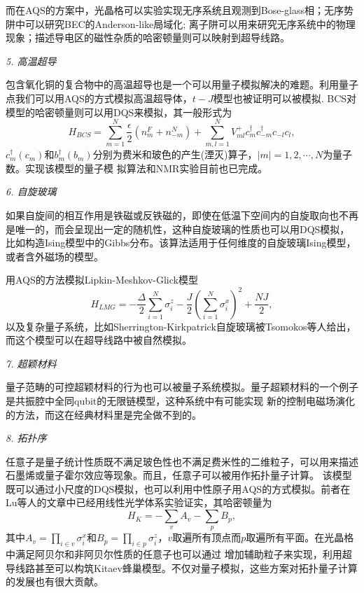 而在AQS的方案中，光晶格可以实验实现无序系统且观测到Bose-glass相\cite{atomsim7}；无序势阱中可以研究BEC的Anderson-like局域化\cite{atomsim6};
离子阱可以用来研究无序系统中的物理现象\cite{dis1}；描述导电区的磁性杂质的哈密顿量则可以映射到超导线路\cite{supersim3}。

\emph{5. 高温超导}

包含氧化铜的复合物中的高温超导也是一个可以用量子模拟解决的难题。利用量子点我们可以用AQS的方式模拟高温超导体\cite{dotsim3}，$t-J$模型也被证明可以被模拟\cite{high1}.
BCS对模型的哈密顿量则可以用DQS来模拟，其一般形式为
 \begin{equation}\label{supersim}
 H_{BCS} = \sum_{m=1}^{N} \frac{\epsilon}{2}(n_m^F+n_{-m}^N)+\sum_{m,l=1}^{N}V_{ml}^{+}c_m^{\dagger}c_{-m}^{\dagger}c_{-l}c_l,
\end{equation}
$c_m^{\dagger}(c_m)$和$b_m^{\dagger}(b_m)$分别为费米和玻色的产生(湮灭)算子，$|m|=1,2,\cdots,N$为量子数。实现该模型的量子模
拟算法\cite{high2}和NMR实验\cite{nmrsim6}目前也已完成。

\emph{6. 自旋玻璃}

如果自旋间的相互作用是铁磁或反铁磁的，即使在低温下空间内的自旋取向也不再是唯一的，而会呈现出一定的随机性，这种自旋玻璃的性质也可以用DQS模拟，
比如构造Ising模型中的Gibbs分布\cite{glass1}。该算法适用于任何维度的自旋玻璃Ising模型，或者含外磁场的模型。

用AQS的方法模拟Lipkin-Meshkov-Glick模型
 \begin{equation}\label{supersim}
 H_{LMG} = -\frac{\Delta}{2}\sum_{i=1}^{N} \sigma_i^z-\frac{J}{2}(\sum_{i=1}^{N}\sigma_i^x)^2+\frac{NJ}{2},
\end{equation}
以及复杂量子系统，比如Sherrington-Kirkpatrick自旋玻璃被Tsomokos等人给出\cite{glass2}，而这个模型可以在超导线路中被自然模拟。

\emph{7. 超颖材料}

量子范畴的可控超颖材料的行为也可以被量子系统模拟\cite{meta1,supersim4}。量子超颖材料的一个例子是共振腔中全同qubit的无限链模型，这种系统中有可能实现
新的控制电磁场演化的方法，而这在经典材料里是完全做不到的。

\emph{8. 拓扑序}

任意子是量子统计性质既不满足玻色性也不满足费米性的二维粒子，可以用来描述石墨烯或量子霍尔效应等现象。而且，任意子可以被用作拓扑量子计算\cite{topo1}。
该模型既可以通过小尺度的DQS模拟\cite{topo2}，也可以利用中性原子用AQS的方式模拟。前者在Lu等人的文章中已经用线性光学体系实验证实\cite{anyons1}，其哈密顿量为
\begin{equation}\label{supersim}
 H_{K} = -\sum_vA_v-\sum_pB_p,
\end{equation}
其中$A_v=\prod_{i\in v}\sigma_i^x$和$B_p=\prod_{i\in p}\sigma_i^z$，$v$取遍所有顶点而$p$取遍所有平面。在光晶格中满足阿贝尔和非阿贝尔性质的任意子也可以通过
增加辅助粒子来实现，利用超导线路甚至可以构筑Kitaev蜂巢模型\cite{anyons2}。不仅对量子模拟，这些方案对拓扑量子计算的发展也有很大贡献。


